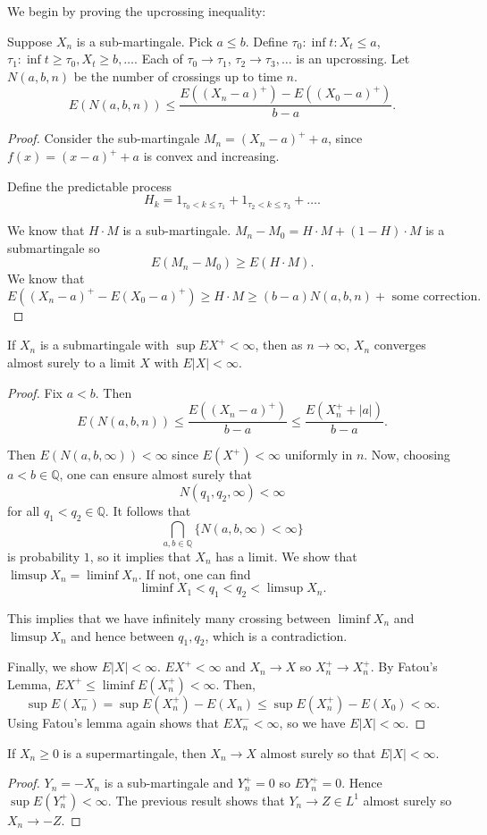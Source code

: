 \documentclass[11pt]{scrartcl}
\newcommand{\Q}{\mathbb{Q}}
\begin{document}
We begin by proving the upcrossing inequality: 
\begin{thm} Suppose $X_n$ is a sub-martingale.  Pick $a \le b$.  Define $\tau_0: \inf t: X_t \le a$, $\tau_1: \inf t \ge \tau_0, X_t \ge b, \dots$.  Each of $\tau_0 \to \tau_1$, $\tau_2 \to \tau_3, \dots$ is an upcrossing.  Let $N(a, b, n)$ be the number of crossings up to time $n$.  
$$E(N(a, b, n)) \le \frac{E((X_n - a)^+) - E((X_0 - a)^+)}{b-a}.$$
\end{thm}
\begin{proof}
Consider the sub-martingale $M_n = (X_n - a)^+ + a$, since $f(x) = (x-a)^+ + a$ is convex and increasing.

Define the predictable process $$H_k = 1_{\tau_0 < k \le \tau_1} + 1_{\tau_2 < k \le \tau_3} + \dots.$$

We know that $H \cdot M$ is a sub-martingale.  $M_n - M_0 = H \cdot M + (1-H) \cdot M$ is a submartingale so 
$$E(M_n - M_0)\ge E(H \cdot M).$$
We know that 
$$E((X_n - a)^+ - E(X_0 - a)^+)\ge H \cdot M \ge (b-a)N(a, b, n) + \text{ some correction}.$$
\end{proof}

\begin{thm} If $X_n$ is a submartingale with $\sup EX^+ < \infty$, then as $n \to \infty$, $X_n $ converges almost surely to a limit $X$ with $E|X| < \infty$.
\end{thm}
\begin{proof} Fix $a < b$.  Then 
$$E(N(a, b, n)) \le \frac{E((X_n - a)^+)}{b-a} \le \frac{E(X_n^+ + |a|)}{b-a}.$$

Then $E(N(a, b, \infty)) < \infty$ since $E(X^+) < \infty$ uniformly in $n$.  Now, choosing $a < b \in \Q$, one can ensure almost surely that 
$$N(q_1, q_2, \infty) <\infty$$
for all $q_1 < q_2 \in \Q$.  It follows that 
$$\bigcap_{a, b \in \Q} \{N(a, b, \infty) < \infty\}$$
is probability $1$, so it implies that $X_n$ has a limit.  We show that $\limsup X_n = \liminf X_n$.  If not, one can find $$\liminf X_1 < q_1 < q_2 < \limsup X_n.$$

This implies that we have infinitely many crossing between $\liminf X_n$ and $\limsup X_n$ and hence between $q_1, q_2$, which is a contradiction. 

Finally, we show $E|X| < \infty$.  $EX^+ < \infty$ and $X_n \to X$ so $X_n^+ \to X_n^+$.  By Fatou's Lemma, $EX^+ \le \liminf E(X_n^+) < \infty$.  Then,
$$\sup E(X_n^-) = \sup E(X_n^+) - E(X_n)\le \sup E(X_n^+) - E(X_0) < \infty.$$
Using Fatou's lemma again shows that $EX_n^- < \infty$, so we have $E|X| < \infty$.
\end{proof}
\begin{corollary} If $X_n \ge 0$ is a supermartingale, then $X_n \to X$ almost surely so that $E|X| < \infty$.
\end{corollary}
\begin{proof}
$Y_n = -X_n$ is a sub-martingale and $Y_n^+ = 0$ so $EY_n^+ = 0$.  Hence $\sup E(Y_n^+) < \infty$.  The previous result shows that $Y_n \to Z \in L^1$ almost surely so $X_n \to -Z$.
\end{proof}
\end{document}
